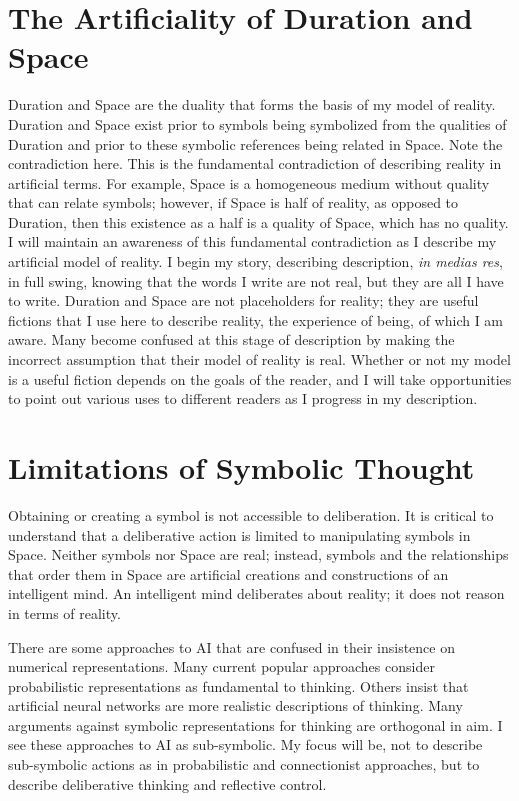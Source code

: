 \section{The Artificiality of Duration and Space}
\label{section:the_artificiality_of_duration_and_space}

Duration and Space are the duality that forms the basis of my model of
reality.  Duration and Space exist prior to symbols being symbolized
from the qualities of Duration and prior to these symbolic references
being related in Space.  Note the contradiction here.  This is the
fundamental contradiction of describing reality in artificial terms.
For example, Space is a homogeneous medium without quality that can
relate symbols; however, if Space is half of reality, as opposed to
Duration, then this existence as a half is a quality of Space, which
has no quality.  I will maintain an awareness of this fundamental
contradiction as I describe my artificial model of reality.  I begin
my story, describing description, \emph{in medias res}, in full swing,
knowing that the words I write are not real, but they are all I have
to write.  Duration and Space are not placeholders for reality; they
are useful fictions that I use here to describe reality, the
experience of being, of which I am aware.  Many become confused at
this stage of description by making the incorrect assumption that
their model of reality is real.  Whether or not my model is a useful
fiction depends on the goals of the reader, and I will take
opportunities to point out various uses to different readers as I
progress in my description.

\section{Limitations of Symbolic Thought}

Obtaining or creating a symbol is not accessible to deliberation.  It
is critical to understand that a deliberative action is limited to
manipulating symbols in Space.  Neither symbols nor Space are real;
instead, symbols and the relationships that order them in Space are
artificial creations and constructions of an intelligent mind.  An
intelligent mind deliberates about reality; it does not reason in
terms of reality.

There are some approaches to AI that are confused in their insistence
on numerical representations.  Many current popular approaches
consider probabilistic representations as fundamental to thinking.
Others insist that artificial neural networks are more realistic
descriptions of thinking.  Many arguments against symbolic
representations for thinking are orthogonal in aim.  I see these
approaches to AI as sub-symbolic.  My focus will be, not to describe
sub-symbolic actions as in probabilistic and connectionist approaches,
but to describe deliberative thinking and reflective control.

